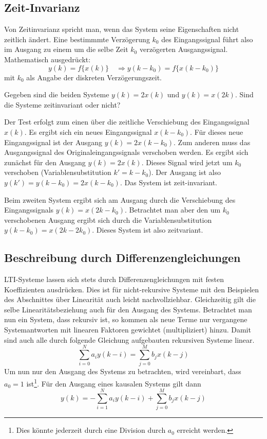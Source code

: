 \subsection{Zeit-Invarianz}
Von Zeitinvarianz spricht man, wenn das System seine Eigenschaften
nicht zeitlich ändert. Eine bestimmmte Verzögerung $k_0$ des
Eingangssignal führt also im Ausgang zu einem um die selbe Zeit
$k_0$ verzögerten Ausgangssignal. Mathematisch ausgedrückt:
\begin{equation}
y(k) = f\{x(k) \} \quad \Rightarrow y(k-k_0) = f\{x(k-k_0) \}
\end{equation}
mit $k_0$ als Angabe der diskreten Verzögerungszeit.

\begin{example}
Gegeben sind die beiden Systeme $y(k) = 2x(k)$ und $y(k) = x(2k)$.
Sind die Systeme zeitinvariant oder nicht?

Der Test erfolgt zum einen über die zeitliche Verschiebung des
Eingangssignal $x(k)$. Es ergibt sich ein neues Eingangssignal
$x(k-k_0)$. Für dieses neue Eingangssignal ist der Ausgang $y(k) =
2x(k-k_0)$. Zum anderen muss das Ausgangssignal des
Originaleingangssignals verschoben werden. Es ergibt sich zunächst
für den Ausgang $y(k) = 2 x(k)$. Dieses Signal wird jetzt um $k_0$
verschoben (Variablensubstitution $k' = k-k_0$). Der Ausgang ist
also $y(k') = y(k-k_0) = 2 x(k-k_0)$. Das System ist
zeit-invariant.

Beim zweiten System ergibt sich am Ausgang durch die Verschiebung
des Eingangssignals $y(k) = x(2k-k_0)$. Betrachtet man aber den um
$k_0$ verschobenen Ausgang ergibt sich durch die
Variablensubstitution $y(k-k_0) = x(2k-2k_0)$. Dieses System ist
also zeitvariant.
\end{example}


\subsection{Beschreibung durch Differenzengleichungen}
LTI-Systeme lassen sich stets durch Differenzengleichungen mit
festen Koeffizienten ausdrücken. Dies ist für nicht-rekursive
Systeme mit den Beispielen des Abschnittes über Linearität auch
leicht nachvollziehbar. Gleichzeitig gilt die selbe
Linearitätsbeziehung auch für den Ausgang des Systems. Betrachtet
man nun ein System, dass rekursiv ist, so kommen als neue Terme
nur vergangene Systemantworten mit linearen Faktoren gewichtet
(multipliziert) hinzu. Damit sind auch alle durch folgende
Gleichung aufgebauten rekursiven Systeme linear.
\begin{equation}
\sum_{i = 0}^{N} a_i y(k-i) = \sum_{j = 0}^{M}b_j x(k-j)
\end{equation}
Um nun nur den Ausgang des Systems zu betrachten, wird vereinbart,
dass $a_0 = 1$ ist\footnote{Dies könnte jederzeit durch eine
Division durch $a_0$ erreicht werden.}. Für den Ausgang eines
kausalen Systems gilt dann
\begin{equation}
y(k) = -\sum_{i = 1}^{N}a_i y(k-i) + \sum_{j = 0}^{M}b_j
x(k-j)
\end{equation}


